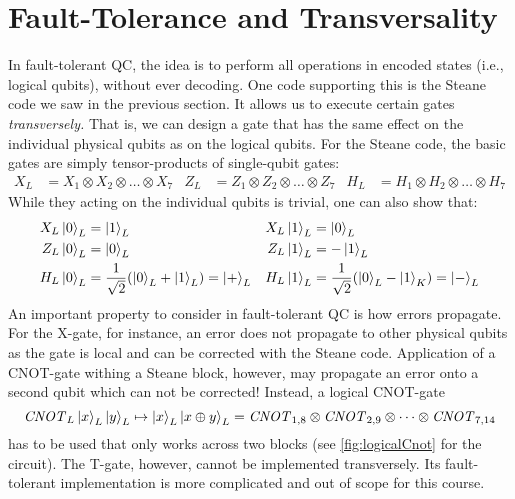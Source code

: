 	\section{Fault-Tolerance and Transversality} %
		\label{subsec:faultTolerance}

		In fault-tolerant \ac{QC}, the idea is to perform all operations in encoded states (i.e., logical qubits), without ever decoding. One code supporting this is the Steane code we saw in the previous section. It allows us to execute certain gates \emph{transversely.} That is, we can design a gate that has the same effect on the individual physical qubits as on the logical qubits. For the Steane code, the basic gates are simply tensor-products of single-qubit gates:
		\begin{align}
			X_L &= X_1 \otimes X_2 \otimes \dots \otimes X_7 &
			Z_L &= Z_1 \otimes Z_2 \otimes \dots \otimes Z_7 &
			H_L &= H_1 \otimes H_2 \otimes \dots \otimes H_7
		\end{align}
		While they acting on the individual qubits is trivial, one can also show that:
		\begin{align}
			X_L \ket{0}_L &=  \ket{1}_L &
			X_L \ket{1}_L &=  \ket{0}_L \\
			Z_L \ket{0}_L &=  \ket{0}_L &
			Z_L \ket{1}_L &= -\ket{1}_L \\
			H_L \ket{0}_L &= \frac{1}{\sqrt{2}} (\ket{0}_L + \ket{1}_L) = \ket{+}_L &
			H_L \ket{1}_L &= \frac{1}{\sqrt{2}} (\ket{0}_L - \ket{1}_K) = \ket{-}_L
		\end{align}
		An important property to consider in fault-tolerant \ac{QC} is how errors propagate. For the X-gate, for instance, an error does not propagate to other physical qubits as the gate is local and can be corrected with the Steane code. Application of a CNOT-gate withing a Steane block, however, may propagate an error onto a second qubit which can not be corrected! Instead, a logical CNOT-gate
		\begin{equation}
			\mathit{CNOT}_L \ket{x}_L \ket{y}_L \mapsto \ket{x}_L \ket{x \oplus y}_L = \mathit{CNOT}_{1, 8} \otimes \mathit{CNOT}_{2, 9} \otimes \dots \otimes \mathit{CNOT}_{7, 14}
		\end{equation}
		has to be used that only works across two blocks (see \autoref{fig:logicalCnot} for the circuit). The T-gate, however, cannot be implemented transversely. Its fault-tolerant implementation is more complicated and out of scope for this course.

